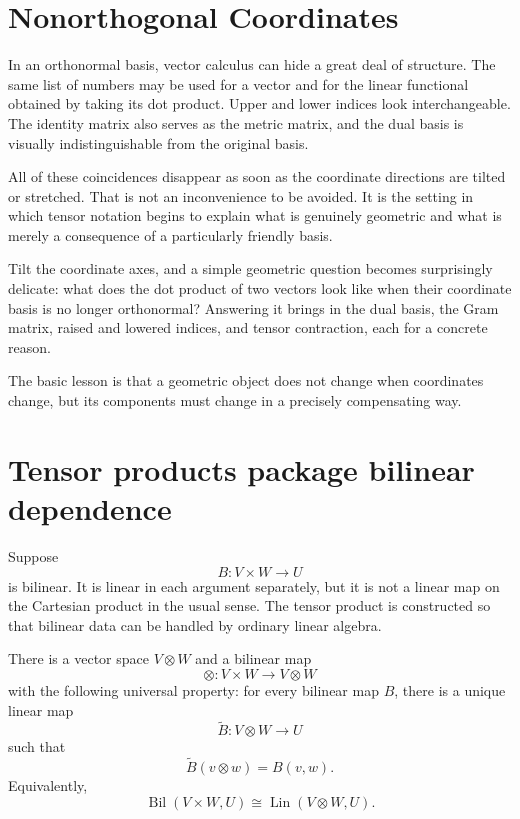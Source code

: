 
\section{Nonorthogonal Coordinates}

In an orthonormal basis, vector calculus can hide a great deal of structure.  The same list of numbers may be used for a vector and for the linear functional obtained by taking its dot product.  Upper and lower indices look interchangeable.  The identity matrix also serves as the metric matrix, and the dual basis is visually indistinguishable from the original basis.

All of these coincidences disappear as soon as the coordinate directions are tilted or stretched.  That is not an inconvenience to be avoided.  It is the setting in which tensor notation begins to explain what is genuinely geometric and what is merely a consequence of a particularly friendly basis.

Tilt the coordinate axes, and a simple geometric question becomes surprisingly delicate: what does the dot product of two vectors look like when their coordinate basis is no longer orthonormal? Answering it brings in the dual basis, the Gram matrix, raised and lowered indices, and tensor contraction, each for a concrete reason.

The basic lesson is that a geometric object does not change when coordinates change, but its components must change in a precisely compensating way.

\section{Tensor products package bilinear dependence}

Suppose
\[
  B:V\times W\longrightarrow U
\]
is bilinear.  It is linear in each argument separately, but it is not a linear map on the Cartesian product in the usual sense.  The tensor product is constructed so that bilinear data can be handled by ordinary linear algebra.

There is a vector space \(V\otimes W\) and a bilinear map
\[
  \otimes:V\times W\longrightarrow V\otimes W
\]
with the following universal property: for every bilinear map \(B\), there is a unique linear map
\[
  \widetilde B:V\otimes W\longrightarrow U
\]
such that
\[
  \widetilde B(v\otimes w)=B(v,w).
\]
Equivalently,
\[
  \operatorname{Bil}(V\times W,U)
  \cong
  \operatorname{Lin}(V\otimes W,U).
\]

